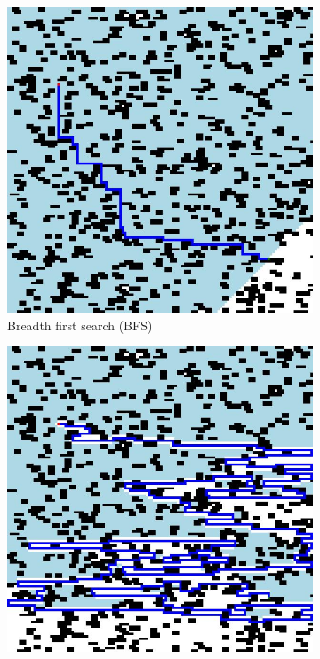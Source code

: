 \documentclass{article}
\begin{document}
\begin{figure}[H]
    \centering
    \begin{subfigure}{0.45\textwidth}
        \centering
        \includegraphics[width = \textwidth]{images/bfs.jpg}
        \caption{Breadth first search (BFS)}
    \end{subfigure}
    \begin{subfigure}{0.45\textwidth}
        \centering
        \includegraphics[width = \textwidth]{images/dfs.jpg}

\end{subfigure}
\end{figure}
\end{document}
